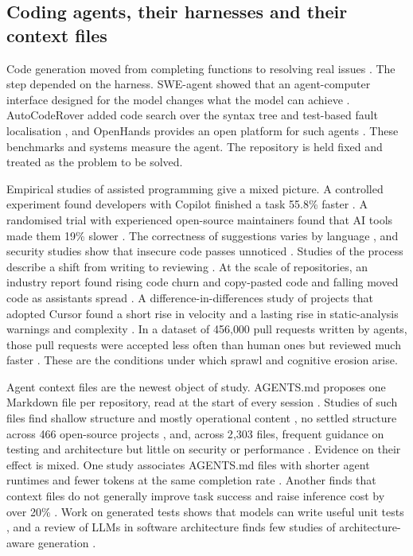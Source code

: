 \subsection{Coding agents, their harnesses and their context files}

Code generation moved from completing functions \citep{chen2021codex} to resolving real issues
\citep{jimenez2024swebench}. The step depended on the harness. SWE-agent showed that an
agent-computer interface designed for the model changes what the model can achieve
\citep{yang2024sweagent}. AutoCodeRover added code search over the syntax tree and test-based
fault localisation \citep{zhang2024autocoderover}, and OpenHands provides an open platform for
such agents \citep{wang2025openhands}. These benchmarks and systems measure the agent. The
repository is held fixed and treated as the problem to be solved.

Empirical studies of assisted programming give a mixed picture. A controlled experiment found
developers with Copilot finished a task 55.8\% faster \citep{peng2023copilot}. A randomised
trial with experienced open-source maintainers found that AI tools made them 19\% slower
\citep{becker2025metr}. The correctness of suggestions varies by language
\citep{nguyen2022copilot}, and security studies show that insecure code passes unnoticed
\citep{pearce2022asleep,perry2023insecure}. Studies of the process describe a shift from
writing to reviewing \citep{vaithilingam2022expectation,barke2023grounded}. At the scale of
repositories, an industry report found rising code churn and copy-pasted code and falling moved
code as assistants spread \citep{harding2024copilot}. A difference-in-differences study of
projects that adopted Cursor found a short rise in velocity and a lasting rise in static-analysis
warnings and complexity \citep{he2026cursor}. In a dataset of 456{,}000 pull requests written by
agents, those pull requests were accepted less often than human ones but reviewed much faster
\citep{li2025aiteammates}. These are the conditions under which sprawl and cognitive erosion
arise.

Agent context files are the newest object of study. AGENTS.md proposes one Markdown file per
repository, read at the start of every session \citep{agentsmd}. Studies of such files find
shallow structure and mostly operational content \citep{chatlatanagulchai2025manifests}, no
settled structure across 466 open-source projects \citep{mohsenimofidi2026context}, and, across
2{,}303 files, frequent guidance on testing and architecture but little on security or
performance \citep{chatlatanagulchai2025agentreadmes}. Evidence on their effect is mixed. One
study associates AGENTS.md files with shorter agent runtimes and fewer tokens at the same
completion rate \citep{lulla2026agentsmd}. Another finds that context files do not generally
improve task success and raise inference cost by over 20\% \citep{gloaguen2026agentsmd}. Work on
generated tests shows that models can write useful unit tests
\citep{schafer2024testgen}, and a review of LLMs in software architecture finds few studies
of architecture-aware generation \citep{schmid2025archllm}.

